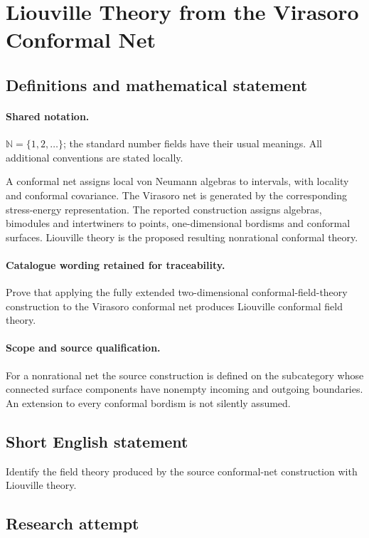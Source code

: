 \documentclass[11pt]{article}
\begin{document}
\section{Liouville Theory from the Virasoro Conformal Net}\label{statement}

\subsection{Definitions and mathematical statement}

\paragraph{Shared notation.}$\mathbb N=\{1,2,\ldots\}$; the standard number fields have their usual meanings. All additional conventions are stated locally.


A conformal net assigns local von Neumann algebras to intervals, with locality and conformal covariance. The Virasoro net is generated by the corresponding stress-energy representation. The reported construction assigns algebras, bimodules and intertwiners to points, one-dimensional bordisms and conformal surfaces. Liouville theory is the proposed resulting nonrational conformal theory.

\paragraph{Catalogue wording retained for traceability.}
Prove that applying the fully extended two-dimensional conformal-field-theory construction to the Virasoro conformal net produces Liouville conformal field theory.

\paragraph{Scope and source qualification.}For a nonrational net the source construction is defined on the subcategory whose connected surface components have nonempty incoming and outgoing boundaries. An extension to every conformal bordism is not silently assumed.
\subsection{Short English statement}
Identify the field theory produced by the source conformal-net construction with Liouville theory.
\subsection{Research attempt}
\end{document}

